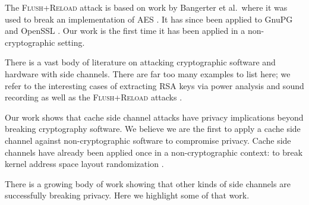 \documentclass[letterpaper,twocolumn,10pt]{article}
\begin{document}
The \textsc{Flush+Reload} attack is based on work by Bangerter et al.\ where it
was used to break an implementation of AES \cite{gullasch2011cache}. It has
since been applied to GnuPG \cite{yarom2013flush} and OpenSSL
\cite{benger2014ooh, yarom2014recovering}. Our work is the first time it has
been applied in a non-cryptographic setting.

There is a vast body of literature on attacking cryptographic software and
hardware with side channels. There are far too many examples to list here; we
refer to the interesting cases of extracting RSA keys via power analysis
\cite{messerges1999power} and sound recording \cite{genkin2013rsa} as well as
the \textsc{Flush+Reload} attacks \cite{yarom2013flush, benger2014ooh,
yarom2014recovering}.

Our work shows that cache side channel attacks have privacy implications beyond
breaking cryptography software. We believe we are the first to apply a cache
side channel against non-cryptographic software to compromise privacy. Cache
side channels have already been applied once in a non-cryptographic context: to
break kernel address space layout randomization \cite{hund2013practical}.

There is a growing body of work showing that other kinds of side channels are
successfully breaking privacy. Here we highlight some of that work.
\end{document}
